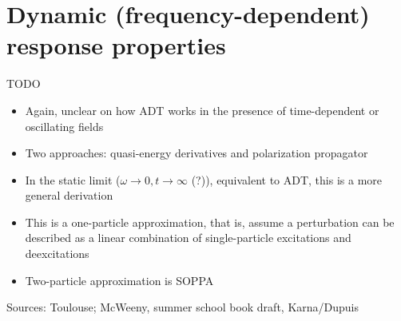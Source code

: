 \documentclass[%
class = book,%
crop = false,%
float = true,%
multi = true,%
preview = false,%
]{standalone}
\begin{document}
\section{Dynamic (frequency-dependent) response properties}
\label{sec:dynamic-properties}

TODO

\begin{itemize}
\item Again, unclear on how ADT works in the presence of time-dependent or oscillating fields
\item Two approaches: quasi-energy derivatives and polarization propagator
\item In the static limit (\(\omega \rightarrow 0, t \rightarrow \infty\) (?)), equivalent to ADT, this is a more general derivation
\item This is a one-particle approximation, that is, assume a perturbation can be described as a linear combination of single-particle excitations and deexcitations
\item Two-particle approximation is SOPPA
\end{itemize}

Sources: Toulouse; McWeeny, summer school book draft, Karna/Dupuis


\end{document}
